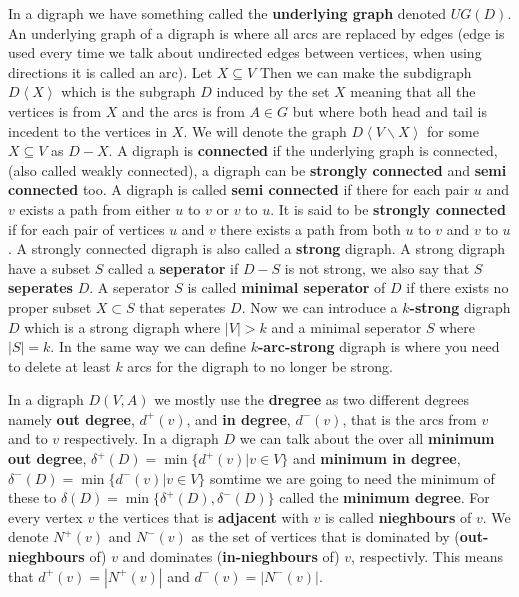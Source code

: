 In a digraph we have something called the \textbf{underlying graph} denoted $UG(D)$. 
An underlying graph of a digraph is where all arcs are replaced by edges (edge is used every time we talk about undirected edges between vertices, when using directions it is called an arc).
Let $X \subseteq V$ Then we can make the subdigraph $D\left< X\right>$ which is the subgraph $D$ induced by the set $X$ meaning that all the vertices is from $X$ and the arcs is from $A\in G$ but where both head and tail is incedent to the vertices in $X$. 
We will denote the graph $D\left< V\backslash X\right>$ for some $X\subseteq V$ as $D-X$.
A digraph is \textbf{connected} if the underlying graph is connected, (also called weakly connected), a digraph can be \textbf{strongly connected} and \textbf{semi connected} too.
A digraph is called \textbf{semi connected} if there for each pair $u$ and $v$ exists a path from either $u$ to $v$ or $v$ to $u$.  
It is said to be \textbf{strongly connected} if for each pair of vertices $u$ and $v$ there exists a path from both $u$ to $v$ and $v$ to $u$. A strongly connected digraph is also called a \textbf{strong} digraph. 
A strong digraph have a subset $S$ called a \textbf{seperator} if $D-S$ is not strong, we also say that $S$ \textbf{seperates} $D$. 
A seperator $S$ is called \textbf{minimal seperator} of $D$ if there exists no proper subset $X\subset S$ that seperates $D$.
Now we can introduce a \textbf{$k$-strong} digraph $D$ which is a strong digraph where $|V|> k$ and a minimal seperator $S$ where $|S|= k$.
In the same way we can define $k$\textbf{-arc-strong} digraph is where you need to delete at least $k$ arcs for the digraph to no longer be strong. 

In a digraph $D(V,A)$ we mostly use the \textbf{dregree} as two different degrees namely \textbf{out degree}, $d^+(v)$, and \textbf{in degree}, $d^-(v)$, that is the arcs from $v$ and to $v$ respectively. 
In a digraph $D$ we can talk about the over all \textbf{minimum out degree}, $\delta ^+(D)=\min\lbrace d^+(v)|v\in V\rbrace$ and \textbf{minimum in degree}, $\delta ^-(D)=\min\lbrace d^-(v)|v\in V\rbrace$
somtime we are going to need the minimum of these to $\delta(D)=\min \lbrace\delta ^+(D),\delta ^-(D) \rbrace$ called the \textbf{minimum degree}.
For every vertex $v$ the vertices that is \textbf{adjacent} with $v$ is called \textbf{nieghbours} of $v$.
We denote $N^+(v)$ and $N^-(v)$ as the set of vertices that is dominated by (\textbf{out-nieghbours} of) $v$ and dominates (\textbf{in-nieghbours} of) $v$, respectivly. 
This means that $d^+(v)=|N^+(v)|$ and $d^-(v)=|N^-(v)|$.\\


